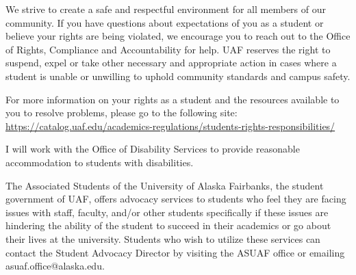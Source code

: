\documentclass[12pt]{article}
\begin{document}
We strive to create a safe and respectful environment for all members of our community. If you have questions about expectations of you as a student or believe your rights are being violated, we encourage you to reach out to the  Office of Rights, Compliance and Accountability for help. UAF reserves the right to suspend, expel or take other necessary and appropriate action in cases where a student is unable or unwilling to uphold community standards and campus safety.

For more information on your rights as a student and the resources available to you to resolve problems, please go to the following site:\\ \url{https://catalog.uaf.edu/academics-regulations/students-rights-responsibilities/}

 I will work with the Office of Disability Services to provide reasonable accommodation to students with disabilities.

 The Associated Students of the University of Alaska Fairbanks, the student government of UAF, offers advocacy services to students who feel they are facing issues with staff, faculty, and/or other students specifically if these issues are hindering the ability of the student to succeed in their academics or go about their lives at the university. Students who wish to utilize these services can contact the Student Advocacy Director by visiting the ASUAF office or emailing asuaf.office@alaska.edu. 
\end{document}
